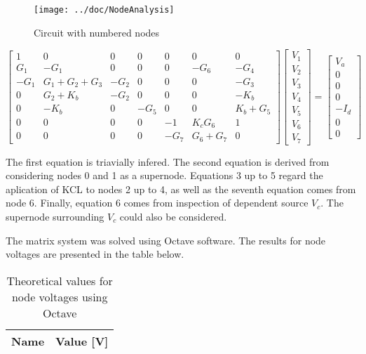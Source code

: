 \begin{figure}[H]
  \centering
  \texttt{[image: ../doc/NodeAnalysis]}
  \caption{Circuit with numbered nodes}
  \label{fig:fignode}
\end{figure}


\begin{equation*}
\begin{bmatrix} 
 1 & 0 & 0 & 0 & 0 & 0 & 0 \\
 G_1 & -G_1 & 0 & 0 & 0 & -G_6 & -G_4 \\
 -G_1 & G_1+G_2+G_3 & -G_2 & 0 & 0 & 0 & -G_3\\
 0 & G_2+K_b & -G_2 & 0 & 0 & 0 & -K_b\\
 0 & -K_b & 0 & -G_5 & 0 & 0 & K_b+G_5\\
 0 & 0 & 0 & 0 & -1 & K_cG_6 & 1\\
 0 & 0 & 0 & 0 & -G_7 & G_6+G_7 & 0\end{bmatrix} 
\begin{bmatrix} 
 V_1\\ V_2\\ V_3\\ V_4\\ V_5\\ V_6\\ V_7\end{bmatrix} 
= 
\begin{bmatrix} 
 V_a\\ 0\\ 0\\ 0\\ -I_d\\ 0\\ 0 \end{bmatrix}
\end{equation*}

\par The first equation is triavially infered. The second equation is derived from considering nodes 0 and 1 as a supernode. Equations 3 up to 5 regard the aplication of KCL to nodes 2 up to 4, as well as the seventh equation comes from node 6. Finally, equation 6 comes from inspection of dependent source $V_c$. The supernode surrounding $V_c$ could also be considered.

\par The matrix system was solved using Octave software. The results for node voltages are presented in the table below.


\begin{table}[H]
  \centering
  \begin{tabular}{|l|r|}
    \hline
    {\bf Name} & {\bf Value [V]} \\ \hline
    
  \end{tabular}
  \caption{Theoretical values for node voltages using Octave}
  \label{tab:TVoltages}
\end{table}

